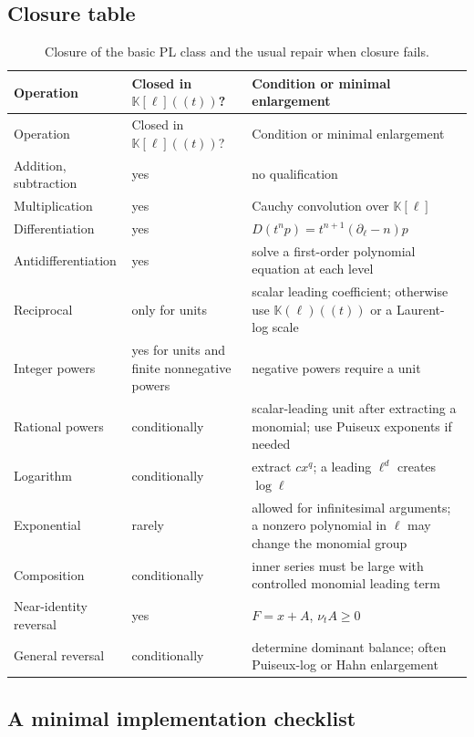 \documentclass[11pt,oneside]{article}
\numberwithin{equation}{section}
\theoremstyle{definition}
\newcommand{\K}{\mathbb{K}}
\newcommand{\ordx}{\nu_t}
\begin{document}
\subsection{Closure table}

\begin{longtable}{@{}p{}p{}p{}@{}}
\caption{Closure of the basic PL class and the usual repair when closure fails.}\label{tab:closure-summary}\\
\toprule
Operation & Closed in \(\K[\ell]((t))\)? & Condition or minimal enlargement\\
\midrule
\endfirsthead
\toprule
Operation & Closed in \(\K[\ell]((t))\)? & Condition or minimal enlargement\\
\midrule
\endhead
Addition, subtraction & yes & no qualification\\
Multiplication & yes & Cauchy convolution over \(\K[\ell]\)\\
Differentiation & yes & \(D(t^np)=t^{n+1}(\partial_\ell-n)p\)\\
Antidifferentiation & yes & solve a first-order polynomial equation at each level\\
Reciprocal & only for units & scalar leading coefficient; otherwise use \(\K(\ell)((t))\) or a Laurent-log scale\\
Integer powers & yes for units and finite nonnegative powers & negative powers require a unit\\
Rational powers & conditionally & scalar-leading unit after extracting a monomial; use Puiseux exponents if needed\\
Logarithm & conditionally & extract \(c x^q\); a leading \(\ell^d\) creates \(\log\ell\)\\
Exponential & rarely & allowed for infinitesimal arguments; a nonzero polynomial in \(\ell\) may change the monomial group\\
Composition & conditionally & inner series must be large with controlled monomial leading term\\
Near-identity reversal & yes & \(F=x+A\), \(\ordx A\ge0\)\\
General reversal & conditionally & determine dominant balance; often Puiseux-log or Hahn enlargement\\
\bottomrule
\end{longtable}

\subsection{A minimal implementation checklist}
\end{document}
